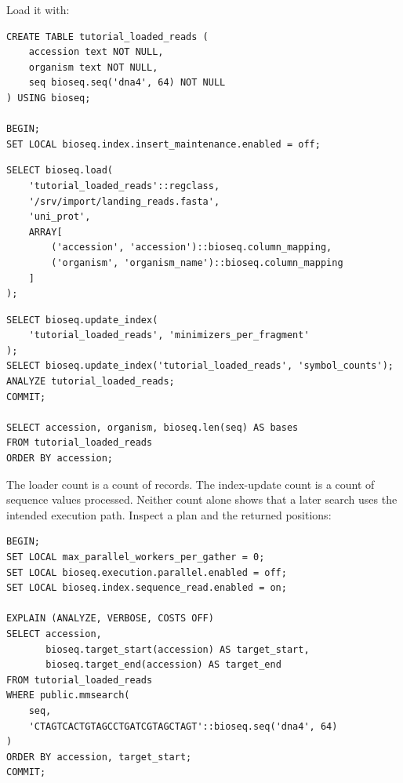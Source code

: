 Load it with:
\par\noindent\begin{minipage}{\linewidth}
\begin{lstlisting}[style=bioseq-appendix-sql]
CREATE TABLE tutorial_loaded_reads (
    accession text NOT NULL,
    organism text NOT NULL,
    seq bioseq.seq('dna4', 64) NOT NULL
) USING bioseq;

BEGIN;
SET LOCAL bioseq.index.insert_maintenance.enabled = off;
\end{lstlisting}
\end{minipage}

\par\noindent\begin{minipage}{\linewidth}
\begin{lstlisting}[style=bioseq-appendix-sql]
SELECT bioseq.load(
    'tutorial_loaded_reads'::regclass,
    '/srv/import/landing_reads.fasta',
    'uni_prot',
    ARRAY[
        ('accession', 'accession')::bioseq.column_mapping,
        ('organism', 'organism_name')::bioseq.column_mapping
    ]
);
\end{lstlisting}
\end{minipage}

\par\noindent\begin{minipage}{\linewidth}
\begin{lstlisting}[style=bioseq-appendix-sql]
SELECT bioseq.update_index(
    'tutorial_loaded_reads', 'minimizers_per_fragment'
);
SELECT bioseq.update_index('tutorial_loaded_reads', 'symbol_counts');
ANALYZE tutorial_loaded_reads;
COMMIT;

SELECT accession, organism, bioseq.len(seq) AS bases
FROM tutorial_loaded_reads
ORDER BY accession;
\end{lstlisting}
\end{minipage}

The loader count is a count of records. The index-update count is a count of
sequence values processed. Neither count alone shows that a later search
uses the intended execution path. Inspect a plan and the returned positions:
\par\noindent\begin{minipage}{\linewidth}
\begin{lstlisting}[style=bioseq-appendix-sql]
BEGIN;
SET LOCAL max_parallel_workers_per_gather = 0;
SET LOCAL bioseq.execution.parallel.enabled = off;
SET LOCAL bioseq.index.sequence_read.enabled = on;

EXPLAIN (ANALYZE, VERBOSE, COSTS OFF)
SELECT accession,
       bioseq.target_start(accession) AS target_start,
       bioseq.target_end(accession) AS target_end
FROM tutorial_loaded_reads
WHERE public.mmsearch(
    seq,
    'CTAGTCACTGTAGCCTGATCGTAGCTAGT'::bioseq.seq('dna4', 64)
)
ORDER BY accession, target_start;
COMMIT;
\end{lstlisting}
\end{minipage}

